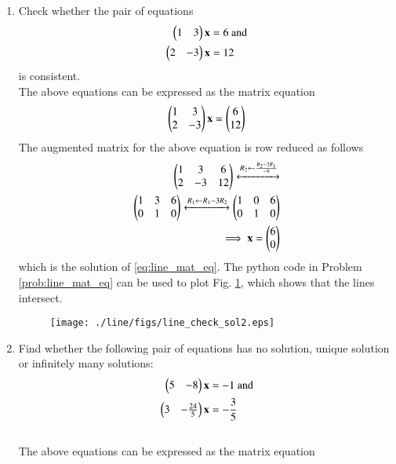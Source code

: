 \begin{enumerate}[label=\arabic*.,ref=\thesubsection.\theenumi]
\item Check whether the pair of equations 
\begin{align}
\label{eq:line_mat_eq_2}
\begin{split}
\begin{pmatrix}1 & 3\end{pmatrix}\mathbf{x}  &= 6 \text{ and}
\\
\begin{pmatrix} 2 & -3\end{pmatrix}\mathbf{x} &= 12 
\end{split}
\end{align}
%
is consistent. 
\\
\solution The above equations can be expressed as the matrix equation
\begin{align}
\begin{pmatrix}1 & 3\\2 & -3\end{pmatrix} \mathbf{x} = \begin{pmatrix}6\\12\end{pmatrix}
\end{align}
%
The augmented matrix for the above equation is row reduced as follows
\begin{align}
\begin{pmatrix}1 & 3 & 6\\2 & -3 & 12\end{pmatrix} 
\xleftrightarrow {R_2\leftarrow \frac{R_2-2R_1}{-9}}
\\
\begin{pmatrix}1 & 3 & 6\\0 & 1 & 0\end{pmatrix} 
\xleftrightarrow {R_1\leftarrow R_1 - 3R_2}\begin{pmatrix}1 & 0 & 6\\0 & 1 & 0\end{pmatrix} 
\\
\implies \mathbf{x} = \begin{pmatrix}6\\0\end{pmatrix}
\end{align}
%
which is the solution of \ref{eq:line_mat_eq}.
The python code in Problem \ref{prob:line_mat_eq}
%
%
can be used to plot Fig. \ref{fig:line_check_sol2}, which shows that the lines intersect.
%
\begin{figure}[!ht]
\texttt{[image: ./line/figs/line\_check\_sol2.eps]}
\caption{}
\label{fig:line_check_sol2}
\end{figure}
%
%
\item Find whether the following pair of equations has no solution, unique solution or infinitely many solutions: 
%
\begin{align}
\label{eq:line_check_sol3}
\begin{split}
\begin{pmatrix}5 & -8\end{pmatrix}\mathbf{x}  &= -1 \text{ and}
\\
\begin{pmatrix} 3 & -\frac{24}{5}\end{pmatrix}\mathbf{x} &= -\frac{3}{5}
\end{split}
\end{align}
%
\\
\solution The above equations can be expressed as the matrix equation
\begin{align}

\end{align}
\end{enumerate}
